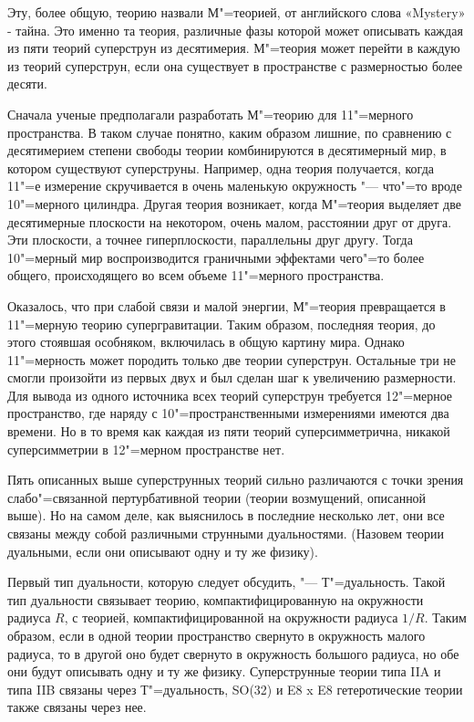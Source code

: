Эту, более общую, теорию назвали М"=теорией, от английского слова «Mystery» - тайна. 
Это именно та теория, различные фазы которой может описывать каждая из пяти теорий суперструн из десятимерия.
М"=теория может перейти в каждую из теорий суперструн, если она существует в пространстве с размерностью более десяти.

Сначала ученые предполагали разработать М"=теорию для 11"=мерного пространства.
В таком случае понятно, каким образом лишние, по сравнению с десятимерием степени свободы теории комбинируются в десятимерный мир, в котором существуют суперструны.
Например, одна теория получается, когда 11"=е измерение скручивается в очень маленькую окружность "--- что"=то вроде 10"=мерного цилиндра.
Другая теория возникает, когда М"=теория выделяет две десятимерные плоскости на некотором, очень малом, расстоянии друг от друга.
Эти плоскости, а точнее гиперплоскости, параллельны друг другу.
Тогда 10"=мерный мир воспроизводится граничными эффектами чего"=то более общего,
происходящего во всем объеме 11"=мерного пространства.

Оказалось, что при слабой связи и малой энергии, М"=теория превращается в 11"=мерную теорию супергравитации. 
Таким образом, последняя теория, до этого стоявшая особняком, включилась в общую картину мира.
Однако 11"=мерность может породить только две теории суперструн.
Остальные три не смогли произойти из первых двух и был сделан шаг к увеличению размерности.
Для вывода из одного источника всех теорий суперструн требуется 12"=мерное пространство,
где наряду с 10"=пространственными измерениями имеются два времени.
Но в то время как каждая из пяти теорий суперсимметрична,
никакой суперсимметрии в 12"=мерном пространстве нет.

Пять описанных выше суперструнных теорий сильно различаются
с точки зрения слабо"=связанной пертурбативной теории (теории возмущений, описанной выше).
Но на самом деле, как выяснилось в последние несколько лет,
они все связаны между собой различными струнными дуальностями.
(Назовем теории дуальными, если они описывают одну и ту же физику). 

Первый тип дуальности, которую следует обсудить, "--- Т"=дуальность.
Такой тип дуальности связывает теорию, компактифицированную на окружности радиуса $R$,
с теорией, компактифицированной на окружности радиуса $1/R$.
Таким образом, если в одной теории пространство свернуто в окружность малого радиуса,
то в другой оно будет свернуто в окружность большого радиуса, но обе они будут описывать одну и ту же физику.
Суперструнные теории типа IIA и типа IIB связаны через Т"=дуальность,
SO(32) и E8 x E8 гетеротические теории также связаны через нее.

